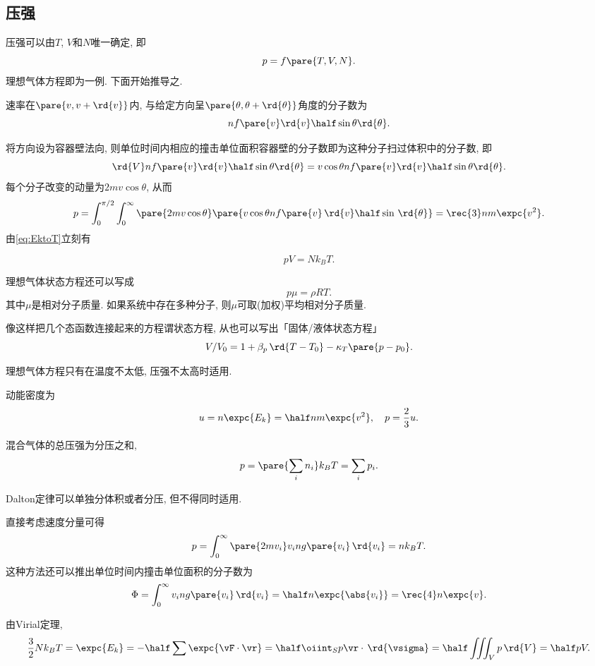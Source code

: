 \documentclass[../Thermal.tex]{subfiles}
\begin{document}
\subsection{压强}
压强可以由$T$, $V$和$N$唯一确定, 即
\[ p = f\pare{T, V, N}. \]
理想气体方程即为一例. 下面开始推导之.
\begin{finale}
速率在$\pare{v, v+\rd{v}}$内, 与给定方向呈$\pare{\theta, \theta+\rd{\theta}}$角度的分子数为
\[ nf\pare{v}\rd{v}\half\sin\theta\rd{\theta}. \]
\end{finale}
将方向设为容器壁法向, 则单位时间内相应的撞击单位面积容器壁的分子数即为这种分子扫过体积中的分子数, 即
\[ \rd{V} nf\pare{v}\rd{v}\half\sin\theta\rd{\theta} = v\cos\theta nf\pare{v}\rd{v}\half\sin\theta\rd{\theta}. \]
每个分子改变的动量为$2mv\cos\theta$, 从而
\[ p=\int_0^{\pi/2}\int_0^\infty \pare{2mv\cos\theta}\pare{v\cos\theta nf\pare{v}\,\rd{v}\half\sin\,\rd{\theta}} = \rec{3}nm\expc{v^2}. \]
由\eqref{eq:EktoT}立刻有
\begin{finale}
\[ pV = Nk_B T. \]
\end{finale}
\begin{remark}
	理想气体状态方程还可以写成
	\[ p\mu = \rho RT. \]
	其中$\mu$是相对分子质量. 如果系统中存在多种分子, 则$\mu$可取(加权)平均相对分子质量.
\end{remark}
\begin{remark}
	像这样把几个态函数连接起来的方程谓状态方程, 从也可以写出「固体/液体状态方程」
	\[ V/V_0 = 1 + \beta_p\,\rd{T-T_0} - \kappa_T\pare{p-p_0}. \]
\end{remark}
\begin{pitfall}
	理想气体方程只有在温度不太低, 压强不太高时适用.
\end{pitfall}
动能密度为
\[ u = n\expc{E_k} = \half nm\expc{v^2},\quad p=\frac{2}{3}u. \]
\begin{finale}
\begin{axiom}[Dalton定律]
混合气体的总压强为分压之和,
\[ p = \pare{\sum_i n_i} k_B T = \sum_i p_i. \]
\end{axiom}
\end{finale}
\begin{pitfall}
Dalton定律可以单独分体积或者分压, 但不得同时适用.
\end{pitfall}
\begin{remark}[另一推导]
直接考虑速度分量可得
\[ p =\int_0^\infty \pare{2mv_i}v_ing\pare{v_i}\,\rd{v_i} = nk_BT. \]
这种方法还可以推出单位时间内撞击单位面积的分子数为
\[ \Phi = \int_0^\infty v_i ng\pare{v_i}\,\rd{v_i} = \half n\expc{\abs{v_i}} = \rec{4} n\expc{v}. \]
\end{remark}
\begin{remark}[从Virial定理推导]
由Virial定理,
\[ \frac{3}{2}Nk_BT = \expc{E_k} = -\half \sum\expc{\vF\cdot\vr} = \half \oiint_S p\vr\cdot\,\rd{\vsigma} = \half \iiint_V p\,\rd{V} = \half pV. \]
\end{remark}
\end{document}
